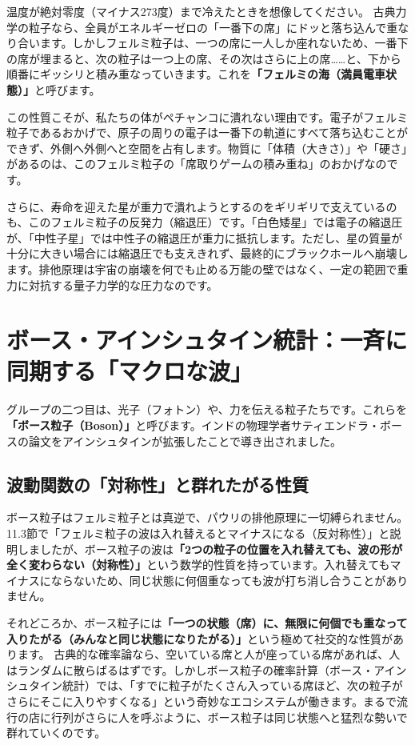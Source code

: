 温度が絶対零度（マイナス273度）まで冷えたときを想像してください。 古典力学の粒子なら、全員がエネルギーゼロの「一番下の席」にドッと落ち込んで重なり合います。しかしフェルミ粒子は、一つの席に一人しか座れないため、一番下の席が埋まると、次の粒子は一つ上の席、その次はさらに上の席\ldots{}\ldots{}と、下から順番にギッシリと積み重なっていきます。これを\textbf{「フェルミの海（満員電車状態）」}と呼びます。

この性質こそが、私たちの体がペチャンコに潰れない理由です。電子がフェルミ粒子であるおかげで、原子の周りの電子は一番下の軌道にすべて落ち込むことができず、外側へ外側へと空間を占有します。物質に「体積（大きさ）」や「硬さ」があるのは、このフェルミ粒子の「席取りゲームの積み重ね」のおかげなのです。

さらに、寿命を迎えた星が重力で潰れようとするのをギリギリで支えているのも、このフェルミ粒子の反発力（縮退圧）です。「白色矮星」では電子の縮退圧が、「中性子星」では中性子の縮退圧が重力に抵抗します。ただし、星の質量が十分に大きい場合には縮退圧でも支えきれず、最終的にブラックホールへ崩壊します。排他原理は宇宙の崩壊を何でも止める万能の壁ではなく、一定の範囲で重力に対抗する量子力学的な圧力なのです。

\section{ボース・アインシュタイン統計：一斉に同期する「マクロな波」}

グループの二つ目は、光子（フォトン）や、力を伝える粒子たちです。これらを\textbf{「ボース粒子（Boson）」}と呼びます。インドの物理学者サティエンドラ・ボースの論文をアインシュタインが拡張したことで導き出されました。

\subsection{波動関数の「対称性」と群れたがる性質}

ボース粒子はフェルミ粒子とは真逆で、パウリの排他原理に一切縛られません。 11.3節で「フェルミ粒子の波は入れ替えるとマイナスになる（反対称性）」と説明しましたが、ボース粒子の波は\textbf{「2つの粒子の位置を入れ替えても、波の形が全く変わらない（対称性）」}という数学的性質を持っています。入れ替えてもマイナスにならないため、同じ状態に何個重なっても波が打ち消し合うことがありません。

それどころか、ボース粒子には\textbf{「一つの状態（席）に、無限に何個でも重なって入りたがる（みんなと同じ状態になりたがる）」}という極めて社交的な性質があります。 古典的な確率論なら、空いている席と人が座っている席があれば、人はランダムに散らばるはずです。しかしボース粒子の確率計算（ボース・アインシュタイン統計）では、「すでに粒子がたくさん入っている席ほど、次の粒子がさらにそこに入りやすくなる」という奇妙なエコシステムが働きます。まるで流行の店に行列がさらに人を呼ぶように、ボース粒子は同じ状態へと猛烈な勢いで群れていくのです。

